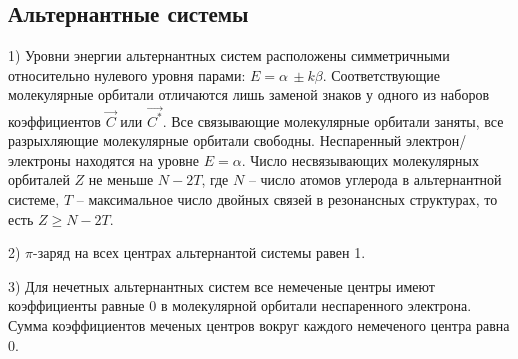 \subsection{Альтернантные системы}
\vspace{1mm}
1) Уровни энергии альтернантных систем расположены симметричными относительно нулевого уровня парами: $E=\alpha\,\pm k\beta$. Соответствующие молекулярные орбитали
отличаются лишь заменой знаков у одного из наборов коэффициентов $\vec{C}$ или $\vec{C^*}$. Все связывающие молекулярные орбитали заняты, все разрыхляющие молекулярные орбитали свободны. Неспаренный электрон/электроны находятся на уровне $E=\alpha$. Число несвязывающих молекулярных орбиталей $Z$ не меньше $N-2T$, где $N$ – число атомов углерода в альтернантной системе, $T$ – максимальное число двойных связей в резонансных структурах, то есть $Z \geq N-2T$.

2) $\pi$-заряд на всех центрах альтернантой системы равен 1.

3) Для нечетных альтернантных систем все немеченые центры имеют коэффициенты равные 0 в молекулярной орбитали неспаренного электрона. Сумма коэффициентов меченых центров вокруг каждого немеченого центра равна 0.

